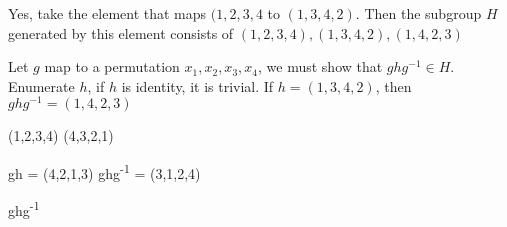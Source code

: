\documentclass[11pt]{article}
\begin{document}
Yes, take the element that maps \((1,2,3,4\) to \((1, 3,4,2)\). Then the
subgroup \(H\) generated by this element consists of \((1,2,3,4), (1,3,4,2), (1,4,2,3)\)


Let \(g\) map to a permutation \(x_1, x_2, x_3, x_4\), we must show that
\(ghg^{-1} \in H\). Enumerate \(h\), if \(h\) is identity, it is trivial. If \(h
= (1,3,4,2)\), then \(ghg^{-1} = (1,4,2,3)\)

(1,2,3,4)
(4,3,2,1)


gh = (4,2,1,3)
ghg\textsuperscript{-1} = (3,1,2,4)



ghg\textsuperscript{-1}
\end{document}
